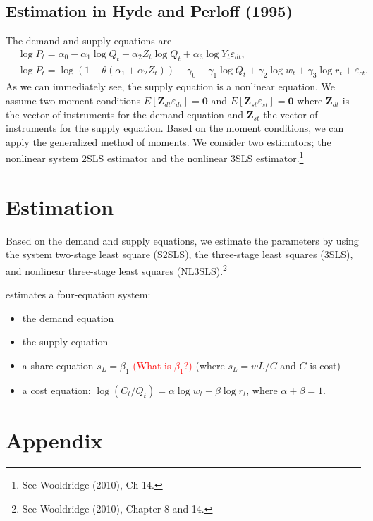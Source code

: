 \documentclass[11pt, a4paper]{article}
\numberwithin{figure}{section}
\theoremstyle{definition}
\newcommand{\0}{\mathbf{0}}
\newcommand{\bmZ}{\bm{Z}}
\begin{document}
\subsection{Estimation in Hyde and Perloff (1995)}
The demand and supply equations are
\begin{align*}
    &\log P_{t} = \alpha_0 - \alpha_1 \log Q_t - \alpha_2 Z_t\log Q_t + \alpha_3 \log Y_t \varepsilon_{dt},\\
    &\log P_t  = \log(1 - \theta(\alpha_1 + \alpha_2 Z_t)) + \gamma_0 + \gamma_1 \log Q_t +  \gamma_2 \log w_t + \gamma_3 \log r_t + \varepsilon_{ct}.
\end{align*}
As we can immediately see, the supply equation is a nonlinear equation.
We assume two moment conditions $E[\bmZ_{dt} \varepsilon_{dt}] = \bm0 $ and $ E[\bmZ_{st} \varepsilon_{st}] =\bm0$ where $\bmZ_{dt}$ is the vector of instruments for the demand equation and $\bmZ_{st}$ the vector of instruments for the supply equation.
Based on the moment conditions, we can apply the generalized method of moments.
We consider two estimators; the nonlinear system 2SLS estimator and the nonlinear 3SLS estimator.\footnote{See Wooldridge (2010), Ch 14.}


\section{Estimation}
Based on the demand and supply equations, we estimate the  parameters by using the system two-stage least square (S2SLS), the three-stage least squares (3SLS), and nonlinear three-stage least squares (NL3SLS).\footnote{See Wooldridge (2010), Chapter 8 and 14.}


\citet{hyde1995can} estimates a four-equation system: 
\begin{itemize}
    \item the demand equation
    \item the supply equation
    \item a share equation $s_L = \beta_1$ \textcolor{red}{(What is $\beta_1$?)} (where $s_L = wL/C$ and $C$ is cost)
    \item a cost equation: $\log(C_t/Q_t) = \alpha \log w_t + \beta \log r_t$, where $ \alpha + \beta = 1$.
\end{itemize}





\section*{Appendix}





\end{document}
